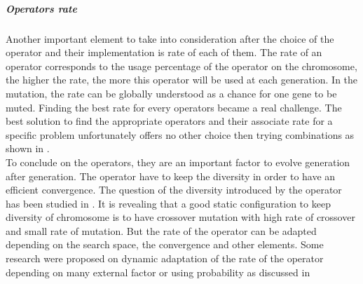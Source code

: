 

\subparagraph{Operators rate}
 Another important element to take into consideration after the choice of the operator and their implementation is  rate of each of them. 
The rate of an operator corresponds to the usage percentage of the operator on the chromosome, the higher the rate, the more this operator will be used at each generation. 
In the mutation, the rate can be globally understood as a chance for one gene to be muted. 
Finding the  best rate for every operators became a real challenge. The best solution to find the appropriate  operators and their associate rate for a specific problem unfortunately offers no other choice then trying  combinations as shown in \cite{73*wright1991,71*grefenstette1986,133*schwefel1984}.\\

 To conclude on the operators, they are an important factor to evolve generation after generation.  The operator have to keep the diversity  in order to have an efficient convergence. The question of the diversity introduced by the operator has been studied in  \cite{80*serpell2010,95*miller1995} \cite{113*mais2010}. 
 It is revealing that a good static configuration to keep diversity \cite{64*matsui1999} of chromosome is to have crossover mutation with high rate of crossover and small rate of mutation. 
But the rate of the operator can be adapted depending on the search space, the convergence and other elements. Some research were proposed on dynamic adaptation of the rate of the operator depending on many external factor or using probability as discussed in  \cite{110*eiben2003,133*schwefel1984,94*srinivas1994}


